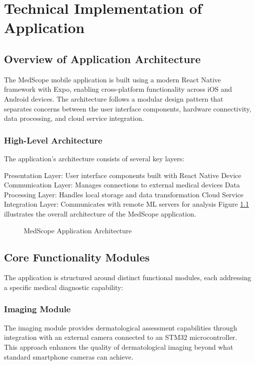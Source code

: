 \chapter{Technical Implementation of Application}

\section{Overview of Application Architecture}

The MedScope mobile application is built using a modern React Native framework with Expo, enabling cross-platform functionality across iOS and Android devices. The architecture follows a modular design pattern that separates concerns between the user interface components, hardware connectivity, data processing, and cloud service integration.

\subsection{High-Level Architecture}

The application's architecture consists of several key layers:

Presentation Layer: User interface components built with React Native
Device Communication Layer: Manages connections to external medical devices
Data Processing Layer: Handles local storage and data transformation
Cloud Service Integration Layer: Communicates with remote ML servers for analysis
Figure \ref{fig:architecture} illustrates the overall architecture of the MedScope application.

\begin{figure} \centering \caption{MedScope Application Architecture} \label{fig:architecture} \end{figure}

\section{Core Functionality Modules}

The application is structured around distinct functional modules, each addressing a specific medical diagnostic capability:

\subsection{Imaging Module}

The imaging module provides dermatological assessment capabilities through integration with an external camera connected to an STM32 microcontroller. This approach enhances the quality of dermatological imaging beyond what standard smartphone cameras can achieve.


